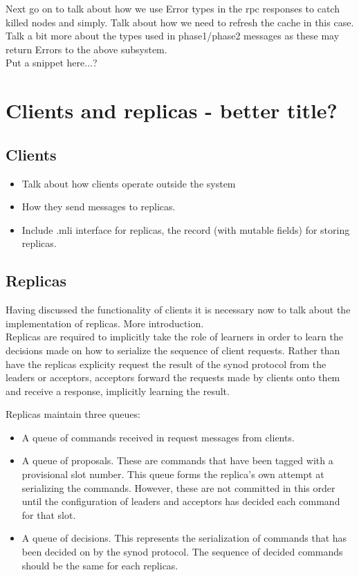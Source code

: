 Next go on to talk about how we use Error types in the rpc responses to catch killed nodes and simply. Talk about how we need to refresh the cache in this case. Talk a bit more about the types used in phase1/phase2 messages as these may return Errors to the above subsystem. \\

{\color{red}Put a snippet here...?}

\section{Clients and replicas - better title?}

{\color{green}
\subsection{Clients}
\begin{itemize}
  \item Talk about how clients operate outside the system
  \item How they send messages to replicas.
  \item Include .mli interface for replicas, the record (with mutable fields) for storing replicas.
\end{itemize}
}

\subsection{Replicas}

Having discussed the functionality of clients it is necessary now to talk about the implementation of replicas. More introduction. \\

Replicas are required to implicitly take the role of learners in order to learn the decisions made on how to serialize the sequence of client requests. Rather than have the replicas explicity request the result of the synod protocol from the leaders or acceptors, acceptors forward the requests made by clients onto them and receive a response, implicitly learning the result.

Replicas maintain three queues: 
\begin{itemize}
  \item A queue of commands received in request messages from clients.
  \item A queue of proposals. These are commands that have been tagged with a provisional slot number. This queue forms the replica's own attempt at serializing the commands. However, these are not committed in this order until the configuration of leaders and acceptors has decided each command for that slot.
  \item A queue of decisions. This represents the serialization of commands that has been decided on by the synod protocol. The sequence of decided commands should be the same for each replicas.
\end{itemize}

